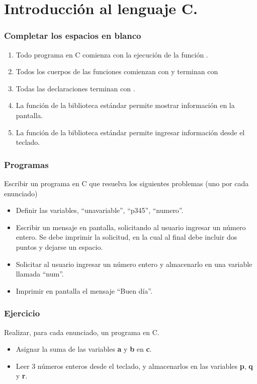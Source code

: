 \section{Introducción al lenguaje C.}
\setcounter{subsection}{3}

\subsubsection{Completar los espacios en blanco} 
\begin{enumerate}
  \item Todo programa en C comienza con la ejecución de la función \underspace.
  \item Todos los cuerpos de las funciones comienzan con \underspace y terminan con \underspace
  \item Todas las declaraciones terminan con \underspace.
  \item La función \underspace de la biblioteca estándar permite mostrar información en la pantalla.
  \item La función \underspace de la biblioteca estándar permite ingresar información desde el teclado.
\end{enumerate}

\subsubsection{Programas}
Escribir un programa en C que resuelva los siguientes problemas (uno por cada enunciado)
\begin{itemize}
  \item Definir las variables, ``unavariable'', ``p345'', ``numero''.
  \item Escribir un mensaje en pantalla, solicitando al usuario ingresar un número entero. Se debe imprimir la
    solicitud, en la cual al final debe incluir dos puntos y dejarse un espacio.
  \item Solicitar al usuario ingresar un número entero y almacenarlo en una variable llamada ``num''.
  \item Imprimir en pantalla el mensaje ``Buen día''.
\end{itemize}

\subsubsection{Ejercicio}
Realizar, para cada enunciado, un programa en C.
\begin{itemize}
  \item Asignar la suma de las variables \textbf{a} y \textbf{b} en \textbf{c}.
  \item Leer 3 números enteros desde el teclado, y almacenarlos en las variables \textbf{p}, \textbf{q} y \textbf{r}.
\end{itemize}


